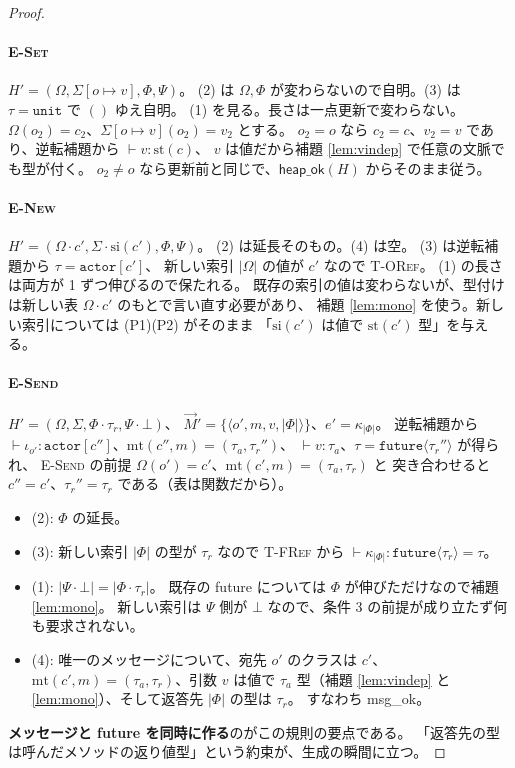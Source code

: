 \documentclass[11pt,a4paper]{ltjsarticle}
\theoremstyle{definition}
\theoremstyle{remark}
\newcommand{\tunit}{\ensuremath{\mathtt{unit}}}
\newcommand{\tact}[1]{\ensuremath{\mathtt{actor}[#1]}}
\newcommand{\tfut}[1]{\ensuremath{\mathtt{future}\langle #1 \rangle}}
\newcommand{\Om}{\Omega}
\newcommand{\Sm}{\Sigma}
\newcommand{\Ph}{\Phi}
\newcommand{\Ps}{\Psi}
\newcommand{\styp}{\mathrm{st}}
\newcommand{\mtab}{\mathrm{mt}}
\newcommand{\sinit}{\mathrm{si}}
\newcommand{\heapok}{\textsf{heap\_ok}}
\newcommand{\msgok}{\textsf{msg\_ok}}
\begin{document}
\begin{proof}
\paragraph{\textsc{E-Set}}
$H' = (\Om,\Sm[o{\mapsto}v],\Ph,\Ps)$。
(2) は $\Om,\Ph$ が変わらないので自明。(3) は $\tau = \tunit$ で $()$ ゆえ自明。
(1) を見る。長さは一点更新で変わらない。
$\Om(o_2) = c_2$、$\Sm[o{\mapsto}v](o_2) = v_2$ とする。
$o_2 = o$ なら $c_2 = c$、$v_2 = v$ であり、逆転補題から $\vdash v : \styp(c)$、
$v$ は値だから補題 \ref{lem:vindep} で任意の文脈でも型が付く。
$o_2 \neq o$ なら更新前と同じで、$\heapok(H)$ からそのまま従う。

\paragraph{\textsc{E-New}}
$H' = (\Om\cdot c', \Sm\cdot\sinit(c'), \Ph, \Ps)$。
(2) は延長そのもの。(4) は空。
(3) は逆転補題から $\tau = \tact{c'}$、
新しい索引 $|\Om|$ の値が $c'$ なので \textsc{T-ORef}。
(1) の長さは両方が 1 ずつ伸びるので保たれる。
既存の索引の値は変わらないが、型付けは新しい表 $\Om\cdot c'$ のもとで言い直す必要があり、
補題 \ref{lem:mono} を使う。新しい索引については (P1)(P2) がそのまま
「$\sinit(c')$ は値で $\styp(c')$ 型」を与える。

\paragraph{\textsc{E-Send}}
$H' = (\Om, \Sm, \Ph\cdot\tau_r, \Ps\cdot\bot)$、
$\vec{M}' = \{\langle o',m,v,|\Ph|\rangle\}$、$e' = \kappa_{|\Ph|}$。
逆転補題から $\vdash \iota_{o'} : \tact{c''}$、$\mtab(c'',m) = (\tau_a,\tau_r'')$、
$\vdash v : \tau_a$、$\tau = \tfut{\tau_r''}$ が得られ、
\textsc{E-Send} の前提 $\Om(o') = c'$、$\mtab(c',m) = (\tau_a,\tau_r)$ と
突き合わせると $c'' = c'$、$\tau_r'' = \tau_r$ である（表は関数だから）。
\begin{itemize}
\item (2): $\Ph$ の延長。
\item (3): 新しい索引 $|\Ph|$ の型が $\tau_r$ なので \textsc{T-FRef} から
  $\vdash \kappa_{|\Ph|} : \tfut{\tau_r} = \tau$。
\item (1): $|\Ps\cdot\bot| = |\Ph\cdot\tau_r|$。
  既存の future については $\Ph$ が伸びただけなので補題 \ref{lem:mono}。
  新しい索引は $\Ps$ 側が $\bot$ なので、条件 3 の前提が成り立たず何も要求されない。
\item (4): 唯一のメッセージについて、宛先 $o'$ のクラスは $c'$、
  $\mtab(c',m) = (\tau_a,\tau_r)$、引数 $v$ は値で $\tau_a$ 型（補題 \ref{lem:vindep} と
  \ref{lem:mono}）、そして返答先 $|\Ph|$ の型は $\tau_r$。
  すなわち \msgok。
\end{itemize}
\textbf{メッセージと future を同時に作る}のがこの規則の要点である。
「返答先の型は呼んだメソッドの返り値型」という約束が、生成の瞬間に立つ。


\end{proof}
\end{document}
